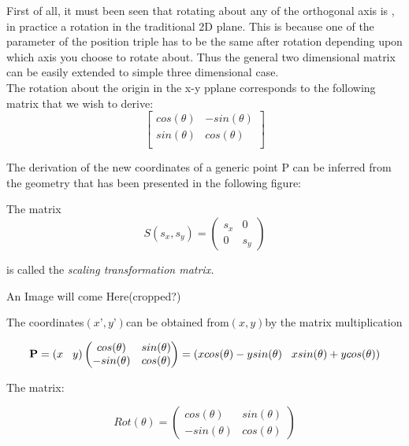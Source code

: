 \documentclass[12pt]{report}
\begin{document}
First of all, it must been seen that rotating about any of the orthogonal axis is , in practice a rotation in the traditional 2D plane. This is because one of the parameter of the position triple has to be the same after rotation depending upon which axis you choose to rotate about. Thus the general two dimensional matrix can be easily extended to simple three dimensional case.
\vspace{0.3cm}
\\The rotation about the origin in the x-y pplane corresponds to the following matrix that we wish to derive:
\[ \begin{bmatrix}
cos(\theta)  &  -sin(\theta) \\
sin(\theta)  &  cos(\theta) \\
\end{bmatrix}\]

\hspace{1cm} The derivation of the new coordinates of a generic point P can be inferred from the geometry that has been presented in the following figure:
\\
\vspace{0.2cm}

The matrix
\[ S(s_{x},s_{y}) = \begin{pmatrix}
s_{x} & 0 \\
0 & s_{y}
\end{pmatrix}  \]
\begin{center}
  is called the \textit{scaling transformation matrix.}

  An Image will come Here(cropped?)
  \vspace{4cm}
\end{center}

The coordinates$ (x’ , y’ ) $can be obtained from$ (x, y) $by the matrix multiplication

\[ \textbf{P} = (x \hspace{0.3cm} y) \begin{pmatrix}
cos(\theta) & sin(\theta) \\
-sin(\theta) & cos(\theta)
\end{pmatrix} = (x cos(\theta) - y sin(\theta) \hspace{0.3cm} x sin(\theta) + y cos(\theta) ) \]

The matrix:

\[ Rot(\theta) = \begin{pmatrix}
cos(\theta) & sin(\theta) \\
-sin(\theta) & cos(\theta)
\end{pmatrix} \]
\end{document}
